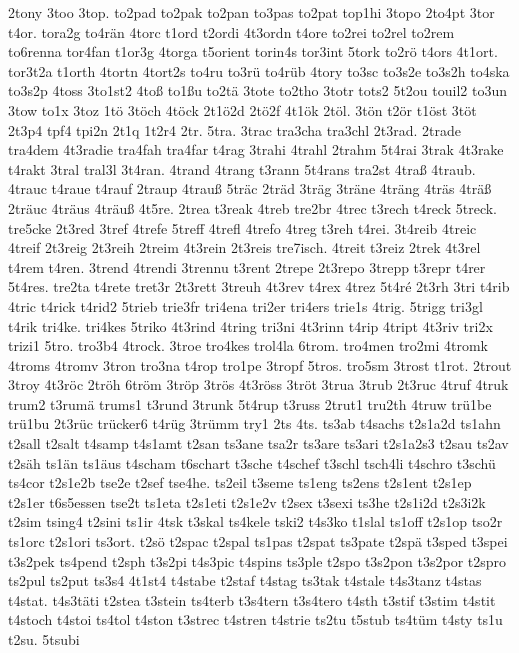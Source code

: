 {2tony
3too
3top.
to2pad
to2pak
to2pan
to3pas
to2pat
top1hi
3topo
2to4pt
3tor
t4or.
tora2g
to4rän
4torc
t1ord
t2ordi
4t3ordn
t4ore
to2rei
to2rel
to2rem
to6renna
tor4fan
t1or3g
4torga
t5orient
torin4s
tor3int
5tork
to2rö
t4ors
4t1ort.
tor3t2a
t1orth
4tortn
4tort2s
to4ru
to3rü
to4rüb
4tory
to3sc
to3s2e
to3s2h
to4ska
to3s2p
4toss
3to1st2
4toß
to1ßu
to2tä
3tote
to2tho
3totr
tots2
5t2ou
touil2
to3un
3tow
to1x
3toz
1tö
3töch
4töck
2t1ö2d
2tö2f
4t1ök
2töl.
3tön
t2ör
t1öst
3töt
2t3p4
tpf4
tpi2n
2t1q
1t2r4
2tr.
5tra.
3trac
tra3cha
tra3chl
2t3rad.
2trade
tra4dem
4t3radie
tra4fah
tra4far
t4rag
3trahi
4trahl
2trahm
5t4rai
3trak
4t3rake
t4rakt
3tral
tral3l
3t4ran.
4trand
4trang
t3rann
5t4rans
tra2st
4traß
4traub.
4trauc
t4raue
t4rauf
2traup
4trauß
5träc
2träd
3träg
3träne
4träng
4träs
4träß
2träuc
4träus
4träuß
4t5re.
2trea
t3reak
4treb
tre2br
4trec
t3rech
t4reck
5treck.
tre5cke
2t3red
3tref
4trefe
5treff
4trefl
4trefo
4treg
t3reh
t4rei.
3t4reib
4treic
4treif
2t3reig
2t3reih
2treim
4t3rein
2t3reis
tre7isch.
4treit
t3reiz
2trek
4t3rel
t4rem
t4ren.
3trend
4trendi
3trennu
t3rent
2trepe
2t3repo
3trepp
t3repr
t4rer
5t4res.
tre2ta
t4rete
tret3r
2t3rett
3treuh
4t3rev
t4rex
4trez
5t4ré
2t3rh
3tri
t4rib
4tric
t4rick
t4rid2
5trieb
trie3fr
tri4ena
tri2er
tri4ers
trie1s
4trig.
5trigg
tri3gl
t4rik
tri4ke.
tri4kes
5triko
4t3rind
4tring
tri3ni
4t3rinn
t4rip
4tript
4t3riv
tri2x
trizi1
5tro.
tro3b4
4trock.
3troe
tro4kes
trol4la
6trom.
tro4men
tro2mi
4tromk
4troms
4tromv
3tron
tro3na
t4rop
tro1pe
3tropf
5tros.
tro5sm
3trost
t1rot.
2trout
3troy
4t3röc
2tröh
6tröm
3tröp
3trös
4t3röss
3tröt
3trua
3trub
2t3ruc
4truf
4truk
trum2
t3rumä
trums1
t3rund
3trunk
5t4rup
t3russ
2trut1
tru2th
4truw
trü1be
trü1bu
2t3rüc
trücker6
t4rüg
3trümm
try1
2ts
4ts.
ts3ab
t4sachs
t2s1a2d
ts1ahn
t2sall
t2salt
t4samp
t4s1amt
t2san
ts3ane
tsa2r
ts3are
ts3ari
t2s1a2s3
t2sau
ts2av
t2säh
ts1än
ts1äus
t4scham
t6schart
t3sche
t4schef
t3schl
tsch4li
t4schro
t3schü
ts4cor
t2s1e2b
tse2e
t2sef
tse4he.
ts2eil
t3seme
ts1eng
ts2ens
t2s1ent
t2s1ep
t2s1er
t6s5essen
tse2t
ts1eta
t2s1eti
t2s1e2v
t2sex
t3sexi
ts3he
t2s1i2d
t2s3i2k
t2sim
tsing4
t2sini
ts1ir
4tsk
t3skal
ts4kele
tski2
t4s3ko
t1slal
ts1off
t2s1op
tso2r
ts1orc
t2s1ori
ts3ort.
t2sö
t2spac
t2spal
ts1pas
t2spat
ts3pate
t2spä
t3sped
t3spei
t3s2pek
ts4pend
t2sph
t3s2pi
t4s3pic
t4spins
ts3ple
t2spo
t3s2pon
t3s2por
t2spro
ts2pul
ts2put
ts3s4
4t1st4
t4stabe
t2staf
t4stag
ts3tak
t4stale
t4s3tanz
t4stas
t4stat.
t4s3täti
t2stea
t3stein
ts4terb
t3s4tern
t3s4tero
t4sth
t3stif
t3stim
t4stit
t4stoch
t4stoi
ts4tol
t4ston
t3strec
t4stren
t4strie
ts2tu
t5stub
ts4tüm
t4sty
ts1u
t2su.
5tsubi
}
